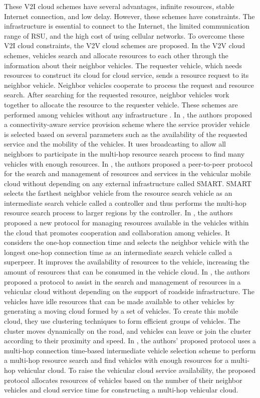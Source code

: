 \documentclass[electronics,aricle,accept,pdftex,moreauthors]{Definitions/mdpi}
\begin{document}
These V2I cloud schemes have several advantages, infinite resources, stable Internet connection, and low delay. However, these schemes have constraints. The infrastructure is essential to connect to the Internet, the limited communication range of RSU, and the high cost of using cellular networks. To overcome these V2I cloud constraints, the V2V cloud schemes are proposed.
In the V2V cloud schemes, vehicles search and allocate resources to each other through the information about their neighbor vehicles. The requester vehicle, which needs resources to construct its cloud for cloud service, sends a resource request to its neighbor vehicle. Neighbor vehicles cooperate to process the request and resource search. After searching for the requested resource, neighbor vehicles work together to allocate the resource to the requester vehicle. These schemes are performed among vehicles without any infrastructure \cite{Sibai2015,Meneguette2016,Meneguette2017b,Choi2018,Meneguette2017j,Meneguette2017}.
In \cite{Sibai2015}, the authors proposed a connectivity-aware service provision scheme where the service provider vehicle is selected based on several parameters such as the availability of the requested service and the mobility of the vehicles. It uses broadcasting to allow all neighbors to participate in the multi-hop resource search process to find many vehicles with enough resources.
In \cite{Meneguette2016}, the authors proposed a peer-to-peer protocol for the search and management of resources and services in the vehicular mobile cloud without depending on any external infrastructure called SMART. SMART selects the farthest neighbor vehicle from the resource search vehicle as an intermediate search vehicle called a controller and thus performs the multi-hop resource search process to larger regions by the controller.
In \cite{Meneguette2017b}, the authors proposed a new protocol for managing resources available in the vehicles within the cloud that promotes cooperation and collaboration among vehicles. It considers the one-hop connection time and selects the neighbor vehicle with the longest one-hop connection time as an intermediate search vehicle called a superpeer. It improves the availability of resources to the vehicle, increasing the amount of resources that can be consumed in the vehicle cloud.
In \cite{Meneguette2017j}, the authors proposed a protocol to assist in the search and management of resources in a vehicular cloud without depending on the support of roadside infrastructure. The vehicles have idle resources that can be made available to other vehicles by generating a moving cloud formed by a set of vehicles. To create this mobile cloud, they use clustering techniques to form efficient groups of vehicles. The cluster moves dynamically on the road, and vehicles can leave or join the cluster according to their proximity and speed.
In \cite{Choi2018}, the authors' proposed protocol uses a multi-hop connection time-based intermediate vehicle selection scheme to perform a multi-hop resource search and find vehicles with enough resources for a multi-hop vehicular cloud. To raise the vehicular cloud service availability, the proposed protocol allocates resources of vehicles based on the number of their neighbor vehicles and cloud service time for constructing a multi-hop vehicular cloud.
\end{document}
